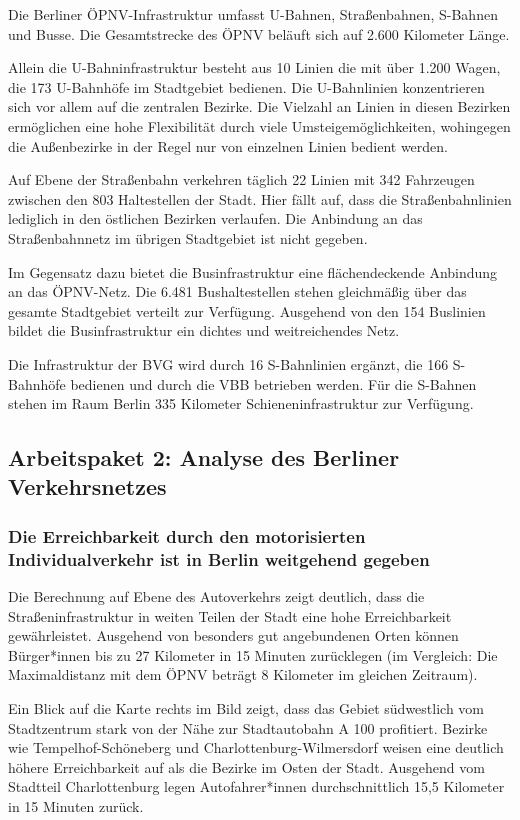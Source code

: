 Die Berliner ÖPNV-Infrastruktur umfasst U-Bahnen, Straßenbahnen, S-Bahnen und Busse. Die Gesamtstrecke des ÖPNV beläuft sich auf 2.600 Kilometer Länge.

Allein die U-Bahninfrastruktur besteht aus 10 Linien die mit über 1.200 Wagen, die 173 U-Bahnhöfe im Stadtgebiet bedienen. Die U-Bahnlinien konzentrieren sich vor allem auf die zentralen Bezirke. Die Vielzahl an Linien in diesen Bezirken ermöglichen eine hohe Flexibilität durch viele Umsteigemöglichkeiten, wohingegen die Außenbezirke in der Regel nur von einzelnen Linien bedient werden.

Auf Ebene der Straßenbahn verkehren täglich 22 Linien mit 342 Fahrzeugen zwischen den 803 Haltestellen der Stadt. Hier fällt auf, dass die Straßenbahnlinien lediglich in den östlichen Bezirken verlaufen. Die Anbindung an das Straßenbahnnetz im übrigen Stadtgebiet ist nicht gegeben.

Im Gegensatz dazu bietet die Businfrastruktur eine flächendeckende Anbindung an das ÖPNV-Netz. Die 6.481 Bushaltestellen stehen gleichmäßig über das gesamte Stadtgebiet verteilt zur Verfügung. Ausgehend von den 154 Buslinien bildet die Businfrastruktur ein dichtes und weitreichendes Netz.

Die Infrastruktur der BVG wird durch 16 S-Bahnlinien ergänzt, die 166 S-Bahnhöfe bedienen und durch die VBB betrieben werden. Für die S-Bahnen stehen im Raum Berlin 335 Kilometer Schieneninfrastruktur zur Verfügung.



\subsection{Arbeitspaket 2: Analyse des Berliner Verkehrsnetzes}

\subsubsection{Die Erreichbarkeit durch den motorisierten Individualverkehr ist in Berlin weitgehend gegeben}

Die Berechnung auf Ebene des Autoverkehrs zeigt deutlich, dass die Straßeninfrastruktur in weiten Teilen der Stadt eine hohe Erreichbarkeit gewährleistet. Ausgehend von besonders gut angebundenen Orten können Bürger*innen bis zu 27 Kilometer in 15 Minuten zurücklegen (im Vergleich: Die Maximaldistanz mit dem ÖPNV beträgt 8 Kilometer im gleichen Zeitraum).

Ein Blick auf die Karte rechts im Bild zeigt, dass das Gebiet südwestlich vom Stadtzentrum stark von der Nähe zur Stadtautobahn A 100 profitiert. Bezirke wie Tempelhof-Schöneberg und Charlottenburg-Wilmersdorf weisen eine deutlich höhere Erreichbarkeit auf als die Bezirke im Osten der Stadt. Ausgehend vom Stadtteil Charlottenburg legen Autofahrer*innen durchschnittlich 15,5 Kilometer in 15 Minuten zurück.


